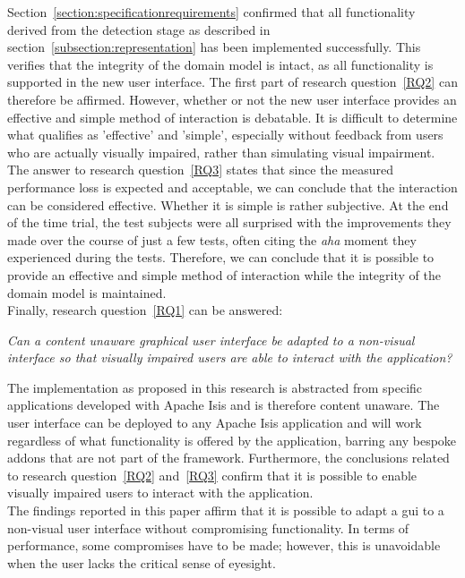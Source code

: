 Section~\ref{section:specificationrequirements} confirmed that all functionality derived from the detection stage as described in section~\ref{subsection:representation} has been implemented successfully. This verifies that the integrity of the domain model is intact, as all functionality is supported in the new user interface. The first part of research question~\ref{RQ2} can therefore be affirmed. However, whether or not the new user interface provides an effective and simple method of interaction is debatable. It is difficult to determine what qualifies as 'effective' and 'simple', especially without feedback from users who are actually visually impaired, rather than simulating visual impairment. The answer to research question~\ref{RQ3} states that since the measured performance loss is expected and acceptable, we can conclude that the interaction can be considered effective. Whether it is simple is rather subjective. At the end of the time trial, the test subjects were all surprised with the improvements they made over the course of just a few tests, often citing the \textit{aha} moment they experienced during the tests. Therefore, we can conclude that it is possible to provide an effective and simple method of interaction while the integrity of the domain model is maintained.\\
\newline
\noindent 
Finally, research question~\ref{RQ1} can be answered:

\begin{displayquote}
	\textit{Can a content unaware graphical user interface be adapted to a non-visual interface so that visually impaired users are able to interact with the application?}
\end{displayquote}

The implementation as proposed in this research is abstracted from specific applications developed with Apache Isis and is therefore content unaware. The user interface can be deployed to any Apache Isis application and will work regardless of what functionality is offered by the application, barring any bespoke addons that are not part of the framework. Furthermore, the conclusions related to research question~\ref{RQ2} and~\ref{RQ3} confirm that it is possible to enable visually impaired users to interact with the application.\\
\newline
The findings reported in this paper affirm that it is possible to adapt a \acrshort{gui} to a non-visual user interface without compromising functionality. In terms of performance, some compromises have to be made; however, this is unavoidable when the user lacks the critical sense of eyesight.


